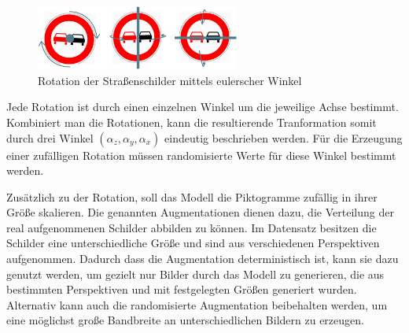 \begin{figure}[h]
	\centering
	\includegraphics[width=0.6\textwidth]{../images/3 Konzeption des Generative Adversarial Networks/Datenaugmentation/Rotation.png}
	\caption{Rotation der Straßenschilder mittels eulerscher Winkel}
	\label{fig:rotation}
\end{figure}


Jede Rotation ist durch einen einzelnen Winkel um die jeweilige Achse bestimmt. Kombiniert man die Rotationen, kann die resultierende Tranformation somit durch drei Winkel $(\alpha_z, \alpha_y, \alpha_x)$ eindeutig beschrieben werden. Für die Erzeugung einer zufälligen Rotation müssen randomisierte Werte für diese Winkel bestimmt werden. \cite{math-primer}

Zusätzlich zu der Rotation, soll das Modell die Piktogramme zufällig in ihrer Größe skalieren. Die genannten Augmentationen dienen dazu, die Verteilung der real aufgenommenen Schilder abbilden zu können. Im Datensatz besitzen die Schilder eine unterschiedliche Größe und sind aus verschiedenen Perspektiven aufgenommen. Dadurch dass die Augmentation deterministisch ist, kann sie dazu genutzt werden, um gezielt nur Bilder durch das Modell zu generieren, die aus bestimmten Perspektiven und mit festgelegten Größen generiert wurden. Alternativ kann auch die randomisierte Augmentation beibehalten werden, um eine möglichst große Bandbreite an unterschiedlichen Bildern zu erzeugen.

